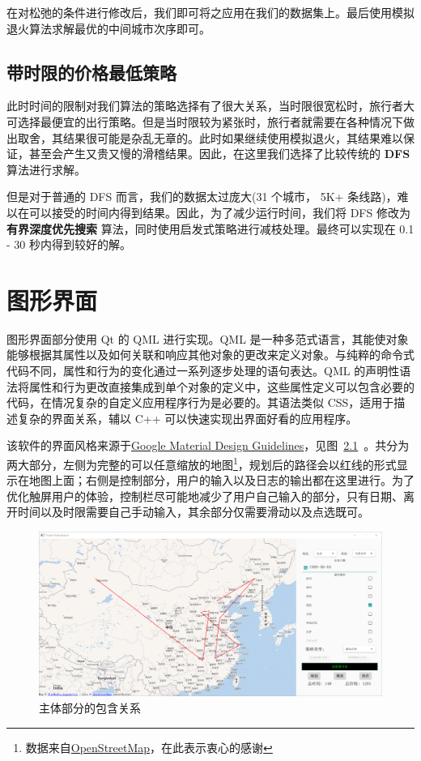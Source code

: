 \documentclass[lang=cn,blue]{elegantbook}
\begin{document}
在对松弛的条件进行修改后，我们即可将之应用在我们的数据集上。最后使用模拟退火算法求解最优的中间城市次序即可。

\section{带时限的价格最低策略}
此时时间的限制对我们算法的策略选择有了很大关系，当时限很宽松时，旅行者大可选择最便宜的出行策略。但是当时限较为紧张时，旅行者就需要在各种情况下做出取舍，其结果很可能是杂乱无章的。此时如果继续使用模拟退火，其结果难以保证，甚至会产生又贵又慢的滑稽结果。因此，在这里我们选择了比较传统的 \textbf{DFS} 算法进行求解。

但是对于普通的 DFS 而言，我们的数据太过庞大(31 个城市， 5K+ 条线路)，难以在可以接受的时间内得到结果。因此，为了减少运行时间，我们将 DFS 修改为 \textbf{有界深度优先搜索} 算法，同时使用启发式策略进行减枝处理。最终可以实现在 0.1 - 30 秒内得到较好的解。

\chapter{图形界面}

图形界面部分使用 Qt 的 QML 进行实现。QML 是一种多范式语言，其能使对象能够根据其属性以及如何关联和响应其他对象的更改来定义对象。与纯粹的命令式代码不同，属性和行为的变化通过一系列逐步处理的语句表达。QML 的声明性语法将属性和行为更改直接集成到单个对象的定义中，这些属性定义可以包含必要的代码，在情况复杂的自定义应用程序行为是必要的。其语法类似 CSS，适用于描述复杂的界面关系，辅以 C++ 可以快速实现出界面好看的应用程序。

该软件的界面风格来源于\href{https://www.google.com/design/spec/material-design/introduction.html}{Google Material Design Guidelines}，见图~\ref{gui}~。共分为两大部分，左侧为完整的可以任意缩放的地图\footnote{数据来自\href{https://www.openstreetmap.org}{OpenStreetMap}，在此表示衷心的感谢}，规划后的路径会以红线的形式显示在地图上面；右侧是控制部分，用户的输入以及日志的输出都在这里进行。为了优化触屏用户的体验，控制栏尽可能地减少了用户自己输入的部分，只有日期、离开时间以及时限需要自己手动输入，其余部分仅需要滑动以及点选既可。

\begin{figure}[!htbp]
	\centering
	\includegraphics[width=1\textwidth]{gui.png}
	\caption{主体部分的包含关系}
	\label{gui}
\end{figure}
\end{document}
